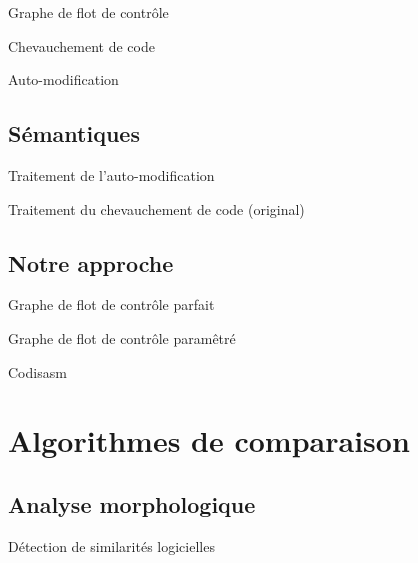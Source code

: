 \documentclass{beamer}
\begin{document}
\begin{frame}{}

\begin{frame}{Graphe de flot de contrôle}

\end{frame}

\begin{frame}{Chevauchement de code}

\end{frame}

\begin{frame}{Auto-modification}

\end{frame}

\subsection{Sémantiques}
\begin{frame}{Traitement de l'auto-modification}

\end{frame}

\begin{frame}{Traitement du chevauchement de code (original)}

\end{frame}

\subsection{Notre approche}
\begin{frame}{Graphe de flot de contrôle parfait}

\end{frame}

\begin{frame}{Graphe de flot de contrôle paramêtré}

\end{frame}

\begin{frame}{Codisasm}

\end{frame}

\section{Algorithmes de comparaison}
\subsection{Analyse morphologique}
\begin{frame}{Détection de similarités logicielles}


\end{frame}
\end{frame}
\end{document}
